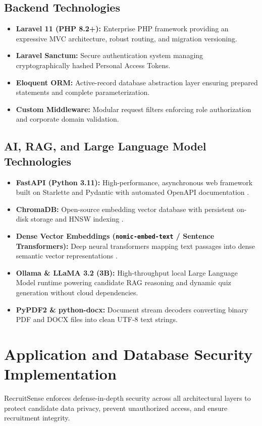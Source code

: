 \subsection{Backend Technologies}
\begin{itemize}
    \item \textbf{Laravel 11 (PHP 8.2+):} Enterprise PHP framework providing an expressive MVC architecture, robust routing, and migration versioning.
    \item \textbf{Laravel Sanctum:} Secure authentication system managing cryptographically hashed Personal Access Tokens.
    \item \textbf{Eloquent ORM:} Active-record database abstraction layer ensuring prepared statements and complete parameterization.
    \item \textbf{Custom Middleware:} Modular request filters enforcing role authorization and corporate domain validation.
\end{itemize}

\subsection{AI, RAG, and Large Language Model Technologies}
\begin{itemize}
    \item \textbf{FastAPI (Python 3.11):} High-performance, asynchronous web framework built on Starlette and Pydantic with automated OpenAPI documentation \cite{ramirez2019fastapi}.
    \item \textbf{ChromaDB:} Open-source embedding vector database with persistent on-disk storage and HNSW indexing \cite{malkov2018hnsw}.
    \item \textbf{Dense Vector Embeddings (\texttt{nomic-embed-text} / Sentence Transformers):} Deep neural transformers mapping text passages into dense semantic vector representations \cite{reimers2019sentence}.
    \item \textbf{Ollama \& LLaMA 3.2 (3B):} High-throughput local Large Language Model runtime powering candidate RAG reasoning and dynamic quiz generation without cloud dependencies.
    \item \textbf{PyPDF2 \& python-docx:} Document stream decoders converting binary PDF and DOCX files into clean UTF-8 text strings.
\end{itemize}

\section{Application and Database Security Implementation}
RecruitSense enforces defense-in-depth security across all architectural layers to protect candidate data privacy, prevent unauthorized access, and ensure recruitment integrity.

